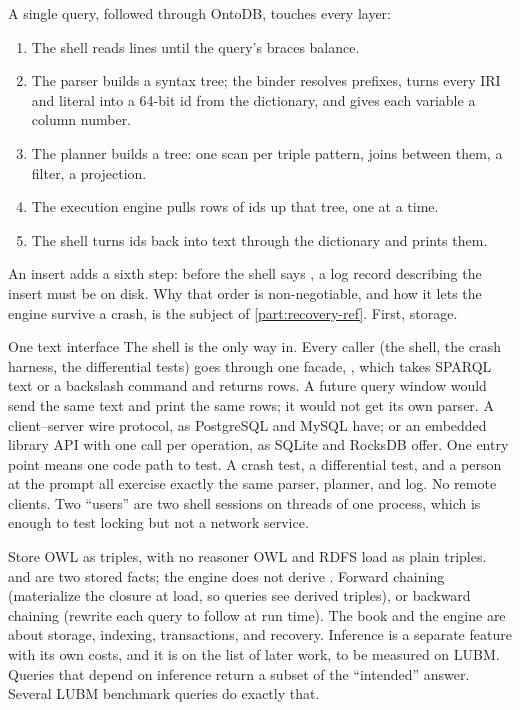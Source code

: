A single query, followed through OntoDB, touches every layer:

\begin{enumerate}
\item The shell reads lines until the query's braces balance.
\item The parser builds a syntax tree; the binder resolves prefixes, turns every IRI and literal into a 64-bit id from the dictionary, and gives each variable a column number.
\item The planner builds a tree: one scan per triple pattern, joins between them, a filter, a projection.
\item The execution engine pulls rows of ids up that tree, one at a time.
\item The shell turns ids back into text through the dictionary and prints them.
\end{enumerate}

An insert adds a sixth step: before the shell says ,
a log record describing the insert must be on disk. Why that order is
non-negotiable, and how it lets the engine survive a crash, is the subject of
\cref{part:recovery-ref}. First, storage.

\begin{decision}{One text interface}
 The shell is the only way in. Every caller (the shell, the
crash harness, the differential tests) goes through one facade,
, which takes SPARQL text or a backslash command and returns
rows. A future query window would send the same text and print the same rows;
it would not get its own parser.
 A client--server wire protocol, as PostgreSQL and MySQL
have; or an embedded library API with one call per operation, as SQLite and
RocksDB offer.
 One entry point means one code path to test. A crash test, a
differential test, and a person at the prompt all exercise exactly the same
parser, planner, and log.
 No remote clients. Two ``users'' are two shell sessions on threads
of one process, which is enough to test locking but not a network service.
\end{decision}

\begin{decision}{Store OWL as triples, with no reasoner}
 OWL and RDFS load as plain triples.  and  are two stored facts; the engine
does not derive .
 Forward chaining (materialize the closure at load, so
queries see derived triples), or backward chaining (rewrite each query to
follow  at run time).
 The book and the engine are about storage, indexing, transactions,
and recovery. Inference is a separate feature with its own costs, and it is on
the list of later work, to be measured on LUBM.
 Queries that depend on inference return a subset of the
``intended'' answer. Several LUBM benchmark queries do exactly that.
\end{decision}

